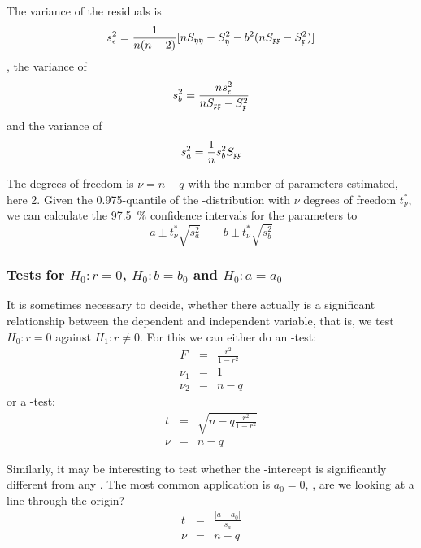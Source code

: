 \begin{refsection}
The variance of the residuals is
\begin{equation}
   s_\epsilon^2 = \frac{1}{n (n-2)} [n S_{\mathfrak{yy}} - S_{\mathfrak{y}}^2 - b^2 (n S_{\mathfrak{xx}} - S_{\mathfrak{x}}^2)]
\end{equation}
, the variance of 
\begin{equation}
  s_b^2 = \frac{n s_\epsilon^2}{n S_{\mathfrak{xx}} - S_{\mathfrak{x}}^2}
\end{equation}
and the variance of 
\begin{equation}
  s_a^2 = \frac{1}{n} s_b^2 S_{\mathfrak{xx}}
\end{equation}

The degrees of freedom is \(\nu = n - q \) with  the number of parameters  estimated, here 2. Given the 0.975-quantile of the -distribution with \(\nu \) degrees of freedom \(t^*_\nu \), we can calculate the \SI{97.5}{\%} confidence intervals for the parameters to
\begin{equation}
  a \pm t^*_\nu \sqrt{s_a^2}\qquad  b \pm t^*_\nu \sqrt{s_b^2}
\end{equation}

\subsubsection{Tests for \(H_0: r=0 \), \(H_0: b=b_0 \) and \(H_0: a=a_0 \)  }

It is sometimes necessary to decide, whether there actually is a significant relationship between the dependent and independent variable, that is, we test \(H_0: r = 0 \) against \(H_1: r \neq 0 \). For this we can either do an -test:
\begin{eqnarray}
  \nonumber
  F &=& \frac{r^2}{1-r^2} \\
  \nonumber
  \nu_1 &=& 1 \\
  \nu_2 &=& n-q
\end{eqnarray}
or a -test:
\begin{eqnarray}
  \nonumber
  t &=& \sqrt{n-q \frac{r^2}{1-r^2}} \\
  \nu &=& n-q
\end{eqnarray}

Similarly, it may be interesting to test whether the -intercept  is significantly different from any . The most common application is \(a_0 = 0 \), , are we looking at a line through the origin?
\begin{eqnarray}
 \nonumber
  t &=& \frac{|a-a_0|}{s_a} \\
  \nu &=& n-q
\end{eqnarray}


\end{refsection}
